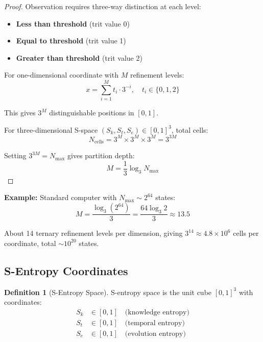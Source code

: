 \documentclass[twocolumn,10pt]{article}
\theoremstyle{definition}
\newtheorem{definition}[theorem]{Definition}
\theoremstyle{remark}
\newcommand{\Sk}{S_k}
\newcommand{\St}{S_t}
\newcommand{\Se}{S_e}
\begin{document}
\begin{proof}
Observation requires three-way distinction at each level:
\begin{itemize}
\item \textbf{Less than threshold} (trit value 0)
\item \textbf{Equal to threshold} (trit value 1)
\item \textbf{Greater than threshold} (trit value 2)
\end{itemize}

For one-dimensional coordinate with $M$ refinement levels:
\begin{equation}
x = \sum_{i=1}^{M} t_i \cdot 3^{-i}, \quad t_i \in \{0, 1, 2\}
\end{equation}

This gives $3^M$ distinguishable positions in $[0,1]$.

For three-dimensional S-space $(\Sk, \St, \Se) \in [0,1]^3$, total cells:
\begin{equation}
N_{\text{cells}} = 3^M \times 3^M \times 3^M = 3^{3M}
\end{equation}

Setting $3^{3M} = N_{\max}$ gives partition depth:
\begin{equation}
M = \frac{1}{3}\log_3 N_{\max}
\end{equation}
\end{proof}

\vspace{0.2cm}
\noindent\textbf{Example:} Standard computer with $N_{\max} \sim 2^{64}$ states:
\begin{equation}
M = \frac{\log_3(2^{64})}{3} = \frac{64 \log_3 2}{3} \approx 13.5
\end{equation}

About 14 ternary refinement levels per dimension, giving $3^{14} \approx 4.8 \times 10^6$ cells per coordinate, total $\sim 10^{20}$ states.

\subsection{S-Entropy Coordinates}

\begin{definition}[S-Entropy Space]
\label{def:s_space}
S-entropy space is the unit cube $[0,1]^3$ with coordinates:
\begin{align}
\Sk &\in [0,1] \quad \text{(knowledge entropy)} \\
\St &\in [0,1] \quad \text{(temporal entropy)} \\
\Se &\in [0,1] \quad \text{(evolution entropy)}
\end{align}
\end{definition}
\end{document}
